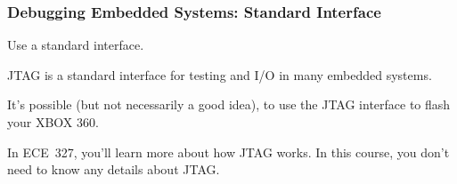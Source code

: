 \begin{frame}
\frametitle{Debugging Embedded Systems: Standard Interface}
\begin{changemargin}{1cm}

Use a standard interface.

JTAG is a standard interface for testing and I/O in many embedded systems. 

It's possible (but not necessarily a good idea), to use the JTAG interface to flash your XBOX 360.

In ECE~327, you'll learn more about how JTAG works. In this course, you don't need to know any details about JTAG.

\end{changemargin}
\end{frame}






